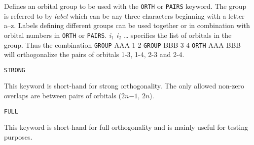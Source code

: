 \begin{keywordlist}
Defines an orbital group to be used with the {\tt ORTH} or
{\tt PAIRS} keyword. The group is referred to by {\em label\/} which
can be any three characters beginning with a letter a--z. Labels
defining different groups can be used together or in combination
with orbital numbers in {\tt ORTH} or {\tt PAIRS}.
{\em i$_1$ i$_2$ \ldots} specifies
the list of orbitals in the group. Thus the combination
{\tt GROUP} AAA 1 2 {\tt GROUP} BBB 3 4 {\tt ORTH} AAA BBB  will orthogonalize
the pairs of orbitals 1-3, 1-4, 2-3 and 2-4.

{\tt STRONG}

This keyword is short-hand for strong orthogonality. The only allowed
non-zero overlaps are between pairs of orbitals ($2n$$-$$1$, $2n$).

{\tt FULL}

This keyword is short-hand for full orthogonality and is mainly
useful for testing purposes.
\end{keywordlist}


